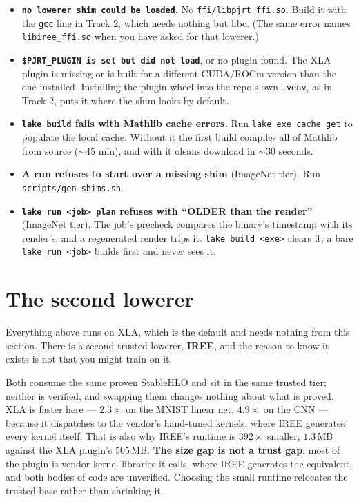 \begin{itemize}
  \item \textbf{\texttt{no lowerer shim could be loaded}.} No
    \texttt{ffi/libpjrt\_ffi.so}. Build it with the \texttt{gcc} line in
    Track 2, which needs nothing but libc. (The same error names
    \texttt{libiree\_ffi.so} when you have asked for that lowerer.)
  \item \textbf{\texttt{\$PJRT\_PLUGIN is set but did not load}}, or no plugin
    found. The XLA plugin is missing or is built for a different CUDA/ROCm
    version than the one installed. Installing the plugin wheel into the repo's
    own \texttt{.venv}, as in Track 2, puts it where the shim looks by default.
  \item \textbf{\texttt{lake build} fails with Mathlib cache errors.} Run
    \texttt{lake exe cache get} to populate the local cache. Without it the
    first build compiles all of Mathlib from source ($\sim$45 min), and with it
    oleans download in $\sim$30 seconds.
  \item \textbf{A run refuses to start over a missing shim} (ImageNet tier).
    Run \texttt{scripts/gen\_shims.sh}.
  \item \textbf{\texttt{lake run <job> plan} refuses with ``OLDER than the render''}
    (ImageNet tier). The job's precheck compares the binary's timestamp with its
    render's, and a regenerated render trips it. \texttt{lake build <exe>}
    clears it; a bare \texttt{lake run <job>} builds first and never sees it.
\end{itemize}

\section*{The second lowerer}

Everything above runs on XLA, which is the default and needs nothing from this
section. There is a second trusted lowerer, \textbf{IREE}, and the reason to
know it exists is not that you might train on it.

\medskip\noindent Both consume the same proven StableHLO and sit in the same
trusted tier; neither is verified, and swapping them changes nothing about what
is proved. XLA is faster here --- $2.3\times$ on the MNIST linear net,
$4.9\times$ on the CNN --- because it dispatches to the vendor's hand-tuned
kernels, where IREE generates every kernel itself. That is also why IREE's
runtime is $392\times$ smaller, $1.3$\,MB against the XLA plugin's $505$\,MB.
\textbf{The size gap is not a trust gap}: most of the plugin is vendor kernel
libraries it calls, where IREE generates the equivalent, and both bodies
of code are unverified. Choosing the small runtime relocates the trusted base
rather than shrinking it.

